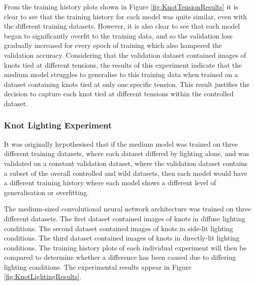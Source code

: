 \documentclass{l4proj}
\begin{document}
From the training history plots shown in Figure \ref{fig:KnotTensionResults} it is clear to see that the training history for each model was quite similar, even with the different training datasets. However, it is also clear to see that each model began to significantly overfit to the training data, and so the validation loss gradually increased for every epoch of training which also hampered the validation accuracy. Considering that the validation dataset contained images of knots tied at different tensions, the results of this experiment indicate that the medium model struggles to generalise to this training data when trained on a dataset containing knots tied at only one specific tension. This result justifies the decision to capture each knot tied at different tensions within the controlled dataset. 

\subsubsection{Knot Lighting Experiment}
It was originally hypothesised that if the medium model was trained on three different training datasets, where each dataset differed by lighting alone, and was validated on a constant validation dataset, where the validation dataset contains a subset of the overall controlled and wild datasets, then each model would have a different training history where each model shows a different level of generalisation or overfitting.

The medium-sized convolutional neural network architecture was trained on three different datasets.
The first dataset contained images of knots in diffuse lighting conditions.
The second dataset contained images of knots in side-lit lighting conditions.
The third dataset contained images of knots in directly-lit lighting conditions.
The training history plots of each individual experiment will then be compared to determine whether a difference has been caused due to differing lighting conditions.
The experimental results appear in Figure \ref{fig:KnotLightingResults}.
\end{document}
